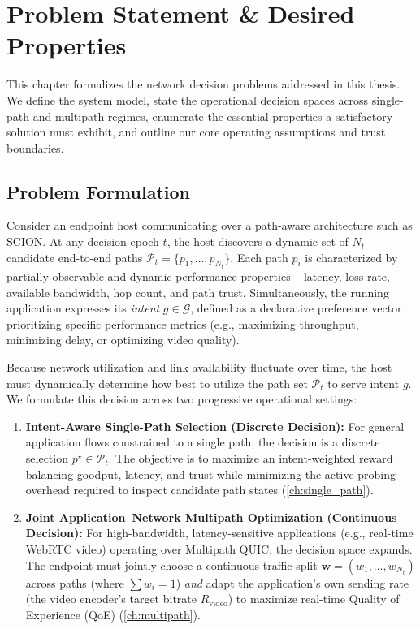 \chapter{Problem Statement \& Desired Properties}
\label{ch:problem}

This chapter formalizes the network decision problems addressed in this thesis. We define the system model, state the operational decision spaces across single-path and multipath regimes, enumerate the essential properties a satisfactory solution must exhibit, and outline our core operating assumptions and trust boundaries.

\section{Problem Formulation}
\label{sec:problem:formulation}

Consider an endpoint host communicating over a path-aware architecture such as SCION. At any decision epoch $t$, the host discovers a dynamic set of $N_t$ candidate end-to-end paths $\mathcal{P}_t = \{p_1, \dots, p_{N_t}\}$. Each path $p_i$ is characterized by partially observable and dynamic performance properties -- latency, loss rate, available bandwidth, hop count, and path trust. Simultaneously, the running application expresses its \emph{intent} $g \in \mathcal{G}$, defined as a declarative preference vector prioritizing specific performance metrics (e.g., maximizing throughput, minimizing delay, or optimizing video quality).

Because network utilization and link availability fluctuate over time, the host must dynamically determine how best to utilize the path set $\mathcal{P}_t$ to serve intent $g$. We formulate this decision across two progressive operational settings:

\begin{enumerate}
  \item \textbf{Intent-Aware Single-Path Selection (Discrete Decision):} For general application flows constrained to a single path, the decision is a discrete selection $p^\star \in \mathcal{P}_t$. The objective is to maximize an intent-weighted reward balancing goodput, latency, and trust while minimizing the active probing overhead required to inspect candidate path states (\cref{ch:single_path}).
  
  \item \textbf{Joint Application--Network Multipath Optimization (Continuous Decision):} For high-bandwidth, latency-sensitive applications (e.g., real-time WebRTC video) operating over Multipath QUIC, the decision space expands. The endpoint must jointly choose a continuous traffic split $\boldsymbol{w} = (w_1, \dots, w_{N_t})$ across paths (where $\sum w_i = 1$) \emph{and} adapt the application's own sending rate (the video encoder's target bitrate $R_{\mathrm{video}}$) to maximize real-time Quality of Experience (QoE) (\cref{ch:multipath}).
\end{enumerate}

